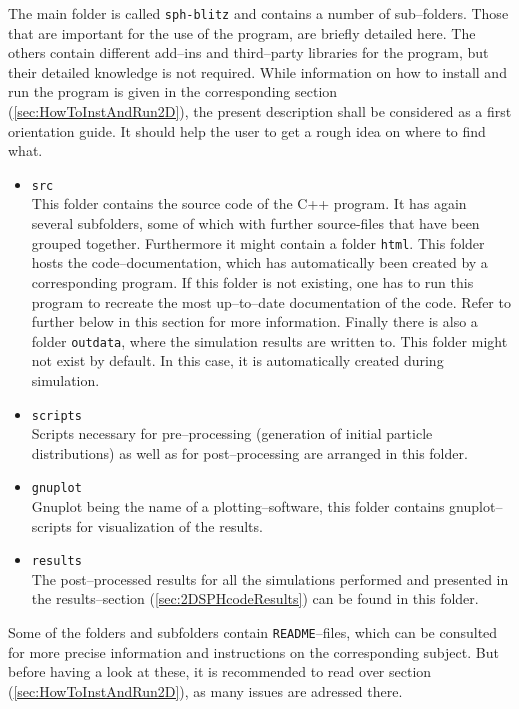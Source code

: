 \documentclass{report}
\begin{document}
The main folder is called {\tt sph-blitz} and contains a number of sub--folders. Those that are important for the use of the program, are briefly detailed here. The others contain different add--ins and third--party libraries for the program, but their detailed knowledge is not required.
While information on how to install and run the program is given in the corresponding section (\ref{sec:HowToInstAndRun2D}), the present description shall be considered as a first orientation guide. It should help the user to get a rough idea on where to find what.
\begin{itemize}
 \item {\tt src}\\
This folder contains the source code of the C++ program. It has again several subfolders, some of which with further source-files that have been grouped together.
Furthermore it might contain a folder {\tt html}. This folder hosts the code--documentation, which has automatically been created by a corresponding program. If this folder is not existing, one has to run this program to recreate the most up--to--date documentation of the code. Refer to further below in this section for more information.
Finally there is also a folder {\tt outdata}, where the simulation results are written to. This folder might not exist by default. In this case, it is automatically created during simulation. 
\item {\tt scripts}\\
Scripts necessary for pre--processing (generation of initial particle distributions) as well as for post--processing  are arranged in this folder.
\item{\tt gnuplot}\\
Gnuplot being the name of a plotting--software, this folder contains gnuplot--scripts for visualization of the results.
\item{\tt results}\\
The post--processed results for all the simulations performed and presented in the results--section (\ref{sec:2DSPHcodeResults}) can be found in this folder. 


\end{itemize}
Some of the folders and subfolders contain {\tt README}--files, which can be consulted for more precise information and instructions on the corresponding subject. But before having a look at these, it is recommended to read over section (\ref{sec:HowToInstAndRun2D}), as many issues are adressed there.
\end{document}

